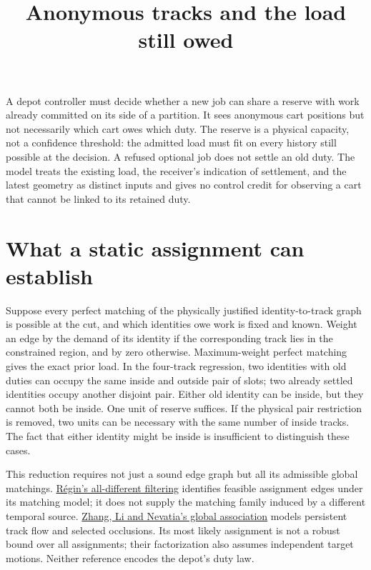 \documentclass[11pt]{article}
\title{Anonymous tracks and the load still owed}
\date{}
\begin{document}
\maketitle

A depot controller must decide whether a new job can share a reserve with
work already committed on its side of a partition. It sees anonymous cart
positions but not necessarily which cart owes which duty. The reserve is a
physical capacity, not a confidence threshold: the admitted load must fit
on every history still possible at the decision. A refused optional job
does not settle an old duty. The model treats the existing load, the
receiver's indication of settlement, and the latest geometry as distinct
inputs and gives no control credit for observing a cart that cannot be
linked to its retained duty.

\section{What a static assignment can establish}

Suppose every perfect matching of the physically justified identity-to-track
graph is possible at the cut, and which identities owe work is fixed and
known. Weight an edge by the demand of its identity if the corresponding
track lies in the constrained region, and by zero otherwise. Maximum-weight
perfect matching gives the exact prior load. In the four-track regression,
two identities with old duties can occupy the same inside and outside
pair of slots; two already settled identities occupy another disjoint
pair. Either old identity can be inside, but they cannot both be inside.
One unit of reserve suffices. If the physical pair restriction is removed,
two units can be necessary with the same number of inside tracks. The fact
that either identity might be inside is insufficient to distinguish these
cases.

This reduction requires not just a sound edge graph but all its admissible
global matchings. \href{https://cdn.aaai.org/AAAI/1994/AAAI94-055.pdf}{R\'egin's
all-different filtering} identifies feasible assignment edges under its
matching model; it does not supply the matching family induced by a
different temporal source. \href{https://www.cvlibs.net/projects/autonomous_vision_survey/literature/Zhang2008CVPR.pdf}{Zhang,
Li and Nevatia's global association} models persistent track flow and
selected occlusions. Its most likely assignment is not a robust bound
over all assignments; their factorization also assumes independent
target motions. Neither reference encodes the depot's duty law.
\end{document}
